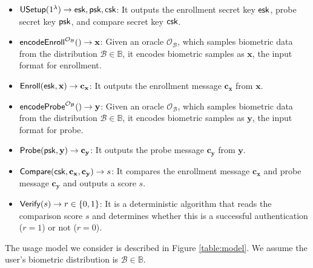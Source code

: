 \begin{itemize}

	\item ${\sf USetup}(1^\lambda) \to {\sf esk}, {\sf psk}, {\sf csk}$: It outputs the enrollment secret key ${\sf esk}$, probe secret key ${\sf psk}$, and compare secret key $\sf csk$.

	\item ${\sf encodeEnroll}^{\mathcal{O}_{\mathcal{B}}}() \to \mathbf{x}$: Given an oracle $\mathcal{O}_{\mathcal{B}}$, which samples biometric data from the distribution $\mathcal{B} \in \mathbb{B}$, it encodes biometric samples as $\mathbf{x}$, the input format for enrollment. 

	\item ${\sf Enroll}({\sf esk}, \mathbf{x}) \to \mathbf{c_x}$: It outputs the enrollment message $\mathbf{c_x}$ from $\mathbf{x}$.

	\item ${\sf encodeProbe}^{\mathcal{O}_{\mathcal{B}}}() \to \mathbf{y}$: Given an oracle $\mathcal{O}_{\mathcal{B}}$, which samples biometric data from the distribution $\mathcal{B} \in \mathbb{B}$, it encodes biometric samples as $\mathbf{y}$, the input format for probe.

	\item ${\sf Probe}({\sf psk}, \mathbf{y}) \to \mathbf{c_y}$: It outputs the probe message $\mathbf{c_y}$ from $\mathbf{y}$.

	\item ${\sf Compare}({\sf csk}, \mathbf{c_x}, \mathbf{c_y)} \to s$: It compares the enrollment message $\mathbf{c_x}$ and probe message $\mathbf{c_y}$ and outputs a score $s$.

	\item ${\sf Verify}(s) \to r \in \{0,1\}$: It is a deterministic algorithm that reads the comparison score $s$ and determines whether this is a successful authentication ($r = 1$) or not ($r = 0$).

\end{itemize}


The usage model we consider is described in Figure \ref{table:model}. We assume the user's biometric distribution is $\mathcal{B} \in \mathbb{B}$.

